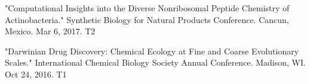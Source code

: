 

\begin{cvpubs}

  \cvpub
    {"Computational Insights into the Diverse Nonribosomal Peptide Chemistry of Actinobacteria." Synthetic Biology for Natural Products Conference. Cancun, Mexico. Mar 6, 2017.} %
    {T2} %

  \cvpub
    {"Darwinian Drug Discovery: Chemical Ecology at Fine and Coarse Evolutionary Scales." International Chemical Biology Society Annual Conference. Madison, WI. Oct 24, 2016.} %
    {T1} %

\end{cvpubs}


